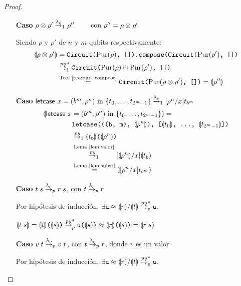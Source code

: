 \begin{proof}
\begin{itemize}
    \item[\textbf{Caso}] $\rho \otimes \rho' \redlam_1 \rho'' \qquad \text{ con } \rho'' = \rho \otimes \rho'$

Siendo $\rho$ y $\rho'$ de $n$ y $m$ qubits respectivamente:
\begin{align*}
\transl{\rho \otimes \rho'} &= \texttt{Circuit(}\Pur(\rho)\texttt{, []).compose(Circuit(}\Pur(\rho')\texttt{, [])} \\
&\redpy_1^* \texttt{Circuit(}\Pur(\rho)\otimes\Pur(\rho')\texttt{, [])}\\
&\stackrel{\textrm{Teo.~\ref{teo:pur_compose}}}{=}\texttt{Circuit(}\Pur(\rho \otimes \rho')\texttt{, [])} = \transl{\rho''}
\end{align*}
    \item[\textbf{Caso}] $\textsf{letcase }x = (b^m, \rho^n) \textrm{ in } \{t_0,\dots,t_{2^m-1}\} \redlam_1 [\rho^n/x]t_{b^m}$
\begin{align*}
    \transl{\textsf{letcase }x &= (b^m, \rho^n) \textrm{ in } \{t_0,\dots,t_{2^m-1}\}} =\\
    &\texttt{letcase(((b, m), \transl{\rho^n}), [\transl{t_0}, \dots, \transl{t_{2^m-1}}])} \\
    &\redpy_1 \transl{t_\texttt{b}}\texttt{(\transl{\rho^n})} \\
    &\stackrel{\textrm{Lema~\ref{lem:valor}}}{\redpy_1} [\transl{\rho^n}/x]\transl{t_\texttt{b}} \\
    &\stackrel{\textrm{Lema~\ref{lem:subst}}}{=} \transl{[\rho^n/x]t_{b^m}}
\end{align*}

    \item[\textbf{Caso}] $t\;s\redlam_p r\;s$, con $t \redlam_p r$

Por hipótesis de inducción, $\exists \texttt{u}\approx \transl{r} / \transl{t} \redpy_p^* \texttt{u}$.

$\transl{t\;s} = \transl{t}\texttt{(}\transl{s}\texttt{)} \redpy^*_p \texttt{u(}\transl{s}\texttt{)} \approx \transl{r}\texttt{(}\transl{s}\texttt{)} = \transl{r\;s}$

    \item[\textbf{Caso}] $v\;t\redlam_p v\;r$, con $t \redlam_p r$, donde $v$ es un valor

Por hipótesis de inducción, $\exists \texttt{u}\approx \transl{r} / \transl{t} \redpy_p^* \texttt{u}$.


\end{itemize}
\end{proof}
